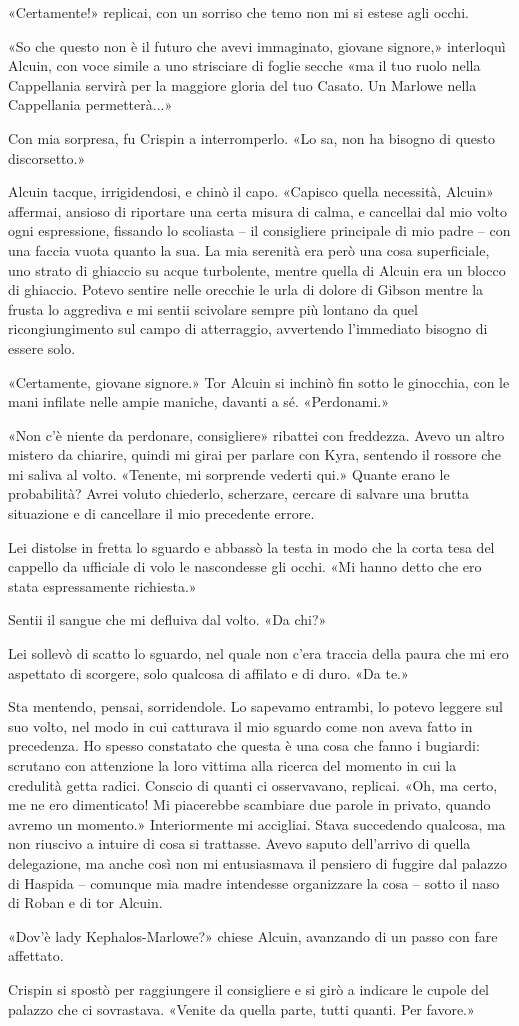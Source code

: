 «Certamente!» replicai, con un sorriso che temo non mi si estese agli
occhi.

«So che questo non è il futuro che avevi immaginato, giovane signore,»
interloquì Alcuin, con voce simile a uno strisciare di foglie secche «ma
il tuo ruolo nella Cappellania servirà per la maggiore gloria del tuo
Casato. Un Marlowe nella Cappellania permetterà...»

Con mia sorpresa, fu Crispin a interromperlo. «Lo sa, non ha bisogno di
questo discorsetto.»

Alcuin tacque, irrigidendosi, e chinò il capo. «Capisco quella
necessità, Alcuin» affermai, ansioso di riportare una certa misura di
calma, e cancellai dal mio volto ogni espressione, fissando lo scoliasta
-- il consigliere principale di mio padre -- con una faccia vuota quanto
la sua. La mia serenità era però una cosa superficiale, uno strato di
ghiaccio su acque turbolente, mentre quella di Alcuin era un blocco di
ghiaccio. Potevo sentire nelle orecchie le urla di dolore di Gibson
mentre la frusta lo aggrediva e mi sentii scivolare sempre più lontano
da quel ricongiungimento sul campo di atterraggio, avvertendo
l'immediato bisogno di essere solo.

«Certamente, giovane signore.» Tor Alcuin si inchinò fin sotto le
ginocchia, con le mani infilate nelle ampie maniche, davanti a sé.
«Perdonami.»

«Non c'è niente da perdonare, consigliere» ribattei con freddezza. Avevo
un altro mistero da chiarire, quindi mi girai per parlare con Kyra,
sentendo il rossore che mi saliva al volto. «Tenente, mi sorprende
vederti qui.» Quante erano le probabilità? Avrei voluto chiederlo,
scherzare, cercare di salvare una brutta situazione e di cancellare il
mio precedente errore.

Lei distolse in fretta lo sguardo e abbassò la testa in modo che la
corta tesa del cappello da ufficiale di volo le nascondesse gli occhi.
«Mi hanno detto che ero stata espressamente richiesta.»

Sentii il sangue che mi defluiva dal volto. «Da chi?»

Lei sollevò di scatto lo sguardo, nel quale non c'era traccia della
paura che mi ero aspettato di scorgere, solo qualcosa di affilato e di
duro. «Da te.»

Sta mentendo, pensai, sorridendole. Lo sapevamo entrambi, lo potevo
leggere sul suo volto, nel modo in cui catturava il mio sguardo come non
aveva fatto in precedenza. Ho spesso constatato che questa è una cosa
che fanno i bugiardi: scrutano con attenzione la loro vittima alla
ricerca del momento in cui la credulità getta radici. Conscio di quanti
ci osservavano, replicai. «Oh, ma certo, me ne ero dimenticato! Mi
piacerebbe scambiare due parole in privato, quando avremo un momento.»
Interiormente mi accigliai. Stava succedendo qualcosa, ma non riuscivo a
intuire di cosa si trattasse. Avevo saputo dell'arrivo di quella
delegazione, ma anche così non mi entusiasmava il pensiero di fuggire
dal palazzo di Haspida -- comunque mia madre intendesse organizzare la
cosa -- sotto il naso di Roban e di tor Alcuin.

«Dov'è lady Kephalos-Marlowe?» chiese Alcuin, avanzando di un passo con
fare affettato.

Crispin si spostò per raggiungere il consigliere e si girò a indicare le
cupole del palazzo che ci sovrastava. «Venite da quella parte, tutti
quanti. Per favore.»

